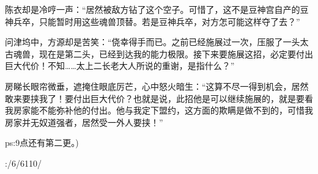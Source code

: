\begin{this_body}
陈衣却是冷哼一声：“居然被敌方钻了这个空子。可惜了，这不是豆神宫自产的豆神兵卒，只能暂时用这些魂兽顶替。若是豆神兵卒，对方怎可能这样夺了去？”

问津坞中，方源却是苦笑：“侥幸得手而已。之前已经施展过一次，压服了一头太古魂兽，现在是第二头，已经到达我的能力极限。接下来要施展这招，必定要付出巨大代价！不知……太上二长老大人所说的重谢，是指什么？”

房睇长眼帘微垂，遮掩住眼底厉芒，心中怒火暗生：“这算不尽一得到机会，居然敢来要挟我了！要付出巨大代价？也就是说，此招他是可以继续施展的，就是要看我房家能不能弥补他的付出。他与我定下盟约，这方面的欺瞒是做不到的，可惜我房家并无奴道强者，居然受一外人要挟！”

ps:9点还有第二更。)

:/6/6110/

\end{this_body}

